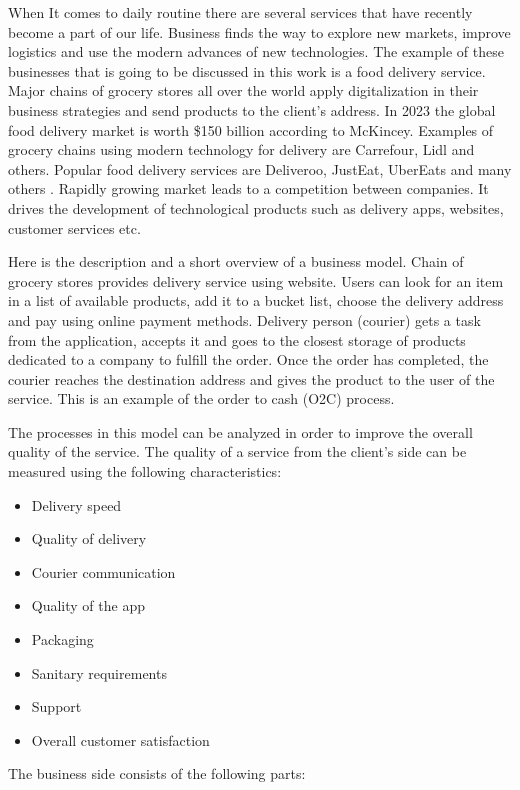 When It comes to daily routine there are several services that have recently become a part of our life.
Business finds the way to explore new markets, improve logistics and use the modern advances of new technologies.
The example of these businesses that is going to be discussed in this work is a food delivery service.
Major chains of grocery stores all over the world apply digitalization in their business strategies and send products to the client’s address.
In 2023 the global food delivery market is worth \$150 billion according to McKincey. Examples of grocery chains using modern technology for delivery are Carrefour, Lidl and others. Popular food delivery services are Deliveroo, JustEat, UberEats and many others . Rapidly growing market leads to a competition between companies. It drives the development of technological products such as delivery apps, websites, customer services etc.

Here is the description and a short overview of a business model. Chain of grocery stores provides delivery service using website. Users can look for an item in a list of available products, add it to a bucket list, choose the delivery address and pay using online payment methods. Delivery person (courier) gets a task from the application, accepts it and goes to the closest storage of products dedicated to a company to fulfill the order. Once the order has completed, the courier reaches the destination address and gives the product to the user of the service. This is an example of the order to cash (O2C) process.

The processes in this model can be analyzed in order to improve the overall quality of the service.
The quality of a service from the client’s side can be measured using the following characteristics:

\begin{itemize}
    \item Delivery speed
    \item Quality of delivery
    \item Courier communication
    \item Quality of the app
    \item Packaging
    \item Sanitary requirements
    \item Support
    \item Overall customer satisfaction
\end{itemize}

The business side consists of the following parts:

